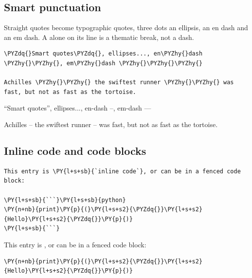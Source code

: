 \documentclass[a4paper,twoside]{article}
\begin{document}
\subsection{Smart punctuation}
Straight quotes become typographic quotes, three dots an ellipsis, \tscodeinline{-\allowbreak{}-\allowbreak{}} an en dash and \tscodeinline{-\allowbreak{}-\allowbreak{}-\allowbreak{}} an em dash. A \tscodeinline{-\allowbreak{}-\allowbreak{}-\allowbreak{}} alone on its line is a thematic break, not a dash.
\begin{tscode}[lang=md, engine=pygments]
\begin{Verbatim}[commandchars=\\\{\},breaklines, breakanywhere, commandchars=\\\{\}]
\PYZdq{}Smart quotes\PYZdq{}, ellipses..., en\PYZhy{}dash \PYZhy{}\PYZhy{}, em\PYZhy{}dash \PYZhy{}\PYZhy{}\PYZhy{}

Achilles \PYZhy{}\PYZhy{} the swiftest runner \PYZhy{}\PYZhy{} was fast, but not as fast as the tortoise.
\end{Verbatim}
\end{tscode}
\begin{displayquote}
\enquote{Smart quotes}, ellipses..., en-dash --, em-dash ---

Achilles -- the swiftest runner -- was fast, but not as fast as the tortoise.
\end{displayquote}
\subsection{Inline code and code blocks}
\begin{tscode}[lang=md, engine=pygments]
\begin{Verbatim}[commandchars=\\\{\},breaklines, breakanywhere, commandchars=\\\{\}]
This entry is \PY{l+s+sb}{`inline code`}, or can be in a fenced code block:

\PY{l+s+sb}{```}\PY{l+s+sb}{python}
\PY{n+nb}{print}\PY{p}{(}\PY{l+s+s2}{\PYZdq{}}\PY{l+s+s2}{Hello}\PY{l+s+s2}{\PYZdq{}}\PY{p}{)}
\PY{l+s+sb}{```}
\end{Verbatim}
\end{tscode}
\begin{displayquote}
This entry is , or can be in a fenced code block:
\begin{tscode}[lang=python, engine=pygments]
\begin{Verbatim}[commandchars=\\\{\},breaklines, breakanywhere, commandchars=\\\{\}]
\PY{n+nb}{print}\PY{p}{(}\PY{l+s+s2}{\PYZdq{}}\PY{l+s+s2}{Hello}\PY{l+s+s2}{\PYZdq{}}\PY{p}{)}
\end{Verbatim}
\end{tscode}
\end{displayquote}
\end{document}
